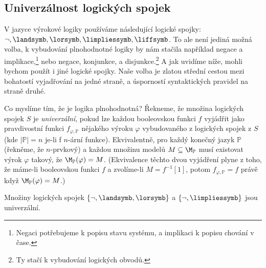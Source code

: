 \subsection{Univerzálnost logických spojek}

V jazyce výrokové logiky používáme následující logické spojky: $\neg, \landsymb,\lorsymb,\limpliessymb,\liffsymb$. To ale není jediná možná volba, k vybudování plnohodnotné logiky by nám stačila například negace a implikace,\footnote{Negaci potřebujeme k popisu stavu systému, a implikaci k popisu chování v čase.} nebo negace, konjunkce, a disjunkce.\footnote{Ty stačí k vybudování logických obvodů.} A jak uvidíme níže, mohli bychom použít i jiné logické spojky. Naše volba je zlatou střední cestou mezi bohatostí vyjadřování na jedné straně, a úsporností syntaktických pravidel na straně druhé. 

Co myslíme tím, že je logika plnohodnotná?
Řekneme, že množina logických spojek $S$ je \emph{univerzální}, pokud lze každou booleovskou funkci $f$ vyjádřit jako pravdivostní funkci $f_{\varphi,\mathbb P}$ nějakého výroku $\varphi$ vybudovaného z logických spojek z $S$ (kde $|\mathbb P|=n$ je-li f $n$-ární funkce). Ekvivalentně, pro každý konečný jazyk $\mathbb P$ (řekněme, že $n$-prvkový) a každou množinu modelů $M\subseteq \M_\mathbb P$ musí existovat výrok $\varphi$ takový, že $\M_\mathbb P(\varphi)=M$. (Ekvivalence těchto dvou vyjádření plyne z toho, že máme-li booleovskou funkci $f$ a zvolíme-li $M=f^{-1}[1]$, potom $f_{\varphi,\mathbb P}=f$ právě když $\M_\mathbb P(\varphi)=M$.)

\begin{proposition} \label{proposition:not-and-or-is-universal}
    Množiny logických spojek $\{\neg, \landsymb,\lorsymb\}$ a $\{\neg, \limpliessymb\}$ jsou univerzální.
\end{proposition}

